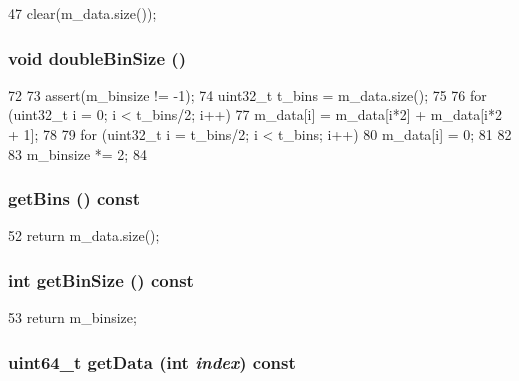 \begin{DoxyCode}
47 { clear(m_data.size()); }
\end{DoxyCode}
\hypertarget{classHistogram_a56d229242423dc417ab298e43fdef39f}{
\subsubsection[{doubleBinSize}]{\setlength{\rightskip}{0pt plus 5cm}void doubleBinSize ()}}
\label{classHistogram_a56d229242423dc417ab298e43fdef39f}



\begin{DoxyCode}
72 {
73     assert(m_binsize != -1);
74     uint32_t t_bins = m_data.size();
75 
76     for (uint32_t i = 0; i < t_bins/2; i++) {
77         m_data[i] = m_data[i*2] + m_data[i*2 + 1];
78     }
79     for (uint32_t i = t_bins/2; i < t_bins; i++) {
80         m_data[i] = 0;
81     }
82 
83     m_binsize *= 2;
84 }
\end{DoxyCode}
\hypertarget{classHistogram_ae09c0cf5b67690adac0d882ffd3e40df}{
\subsubsection[{getBins}]{ getBins () const}}
\label{classHistogram_ae09c0cf5b67690adac0d882ffd3e40df}



\begin{DoxyCode}
52 { return m_data.size(); }
\end{DoxyCode}
\hypertarget{classHistogram_a6bc601db303f3dfda909618c78ec02e7}{
\subsubsection[{getBinSize}]{\setlength{\rightskip}{0pt plus 5cm}int getBinSize () const}}
\label{classHistogram_a6bc601db303f3dfda909618c78ec02e7}



\begin{DoxyCode}
53 { return m_binsize; }
\end{DoxyCode}
\hypertarget{classHistogram_abd462934da926cae3c5a17d71cd266d9}{
\subsubsection[{getData}]{\setlength{\rightskip}{0pt plus 5cm}uint64\_\-t getData (int {\em index}) const}}
\label{classHistogram_abd462934da926cae3c5a17d71cd266d9}



